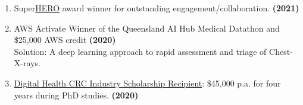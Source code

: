 \begin{enumerate}
	\item Super\href{https://healthequity.link/}{HERO} award winner for outstanding engagement/collaboration. \hfill\textbf{(2021)}
    \item AWS Activate Winner of the Queensland AI Hub Medical Datathon and \$25,000 AWS credit \hfill\textbf{(2020)}\\
	Solution: A deep learning approach to rapid assessment and triage of Chest-X-rays.
	\item \href{https://www.credly.com/badges/ad81135e-f5a0-4f0f-beee-06144ec4d66e/public_url}{Digital Health CRC Industry Scholarship Recipient}: \$45,000 p.a. for four years during PhD studies. \hfill\textbf{(2020)}
\end{enumerate}\par
